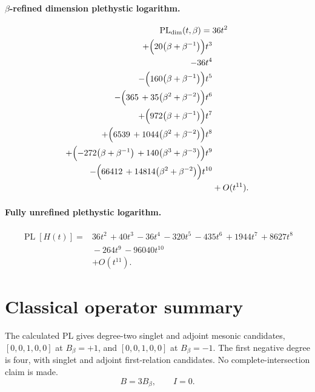 \documentclass[10pt]{article}
\begin{document}
\paragraph{$\beta$-refined dimension plethystic logarithm.}
\[
\begin{aligned}
\operatorname{PL}_{\mathrm{dim}}(t,\beta) ={}&
   36t^{2} \\
  + \Bigl(20\bigl(\beta+\beta^{-1}\bigr)\Bigr)t^{3} \\
  -36t^{4} \\
  -\Bigl(160\bigl(\beta+\beta^{-1}\bigr)\Bigr)t^{5} \\
  -\Bigl(365\,+35\bigl(\beta^{2}+\beta^{-2}\bigr)\Bigr)t^{6} \\
  + \Bigl(972\bigl(\beta+\beta^{-1}\bigr)\Bigr)t^{7} \\
  + \Bigl(6539\,+1044\bigl(\beta^{2}+\beta^{-2}\bigr)\Bigr)t^{8} \\
  + \Bigl(-272\bigl(\beta+\beta^{-1}\bigr)\,+140\bigl(\beta^{3}+\beta^{-3}\bigr)\Bigr)t^{9} \\
  -\Bigl(66412\,+14814\bigl(\beta^{2}+\beta^{-2}\bigr)\Bigr)t^{10} \\
  &+ O(t^{11}).
\end{aligned}
\]
\paragraph{Fully unrefined plethystic logarithm.}
\[
\begin{aligned}
\operatorname{PL}[H(t)] ={}& 36t^{2}\,+40t^{3}\,-36t^{4}\,-320t^{5}\,-435t^{6}\,+1944t^{7}\,+8627t^{8} \\
  &{}-264t^{9}\,-96040t^{10} \\
  &+ O(t^{11}).
\end{aligned}
\]
\section{Classical operator summary}
The calculated PL gives degree-two singlet and adjoint mesonic candidates,
$[0,0,1,0,0]$ at $B_\beta=+1$, and $[0,0,1,0,0]$ at $B_\beta=-1$.
The first negative degree is four, with singlet and adjoint first-relation
candidates. No complete-intersection claim is made.
\[B=3B_\beta,\qquad I=0.\]
\end{document}
